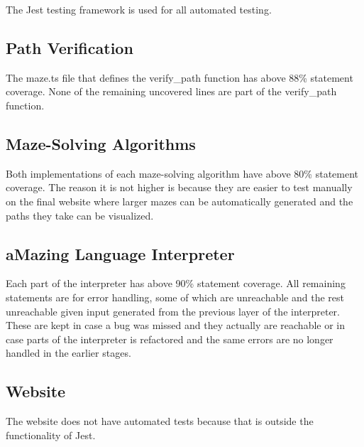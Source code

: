 The Jest \cite{jest} testing framework is used for all automated testing.

\subsection{Path Verification}

The maze.ts file that defines the verify\_path function has above 88\% statement coverage. None of the remaining uncovered lines are part of the verify\_path function.

\subsection{Maze-Solving Algorithms}

Both implementations of each maze-solving algorithm have above 80\% statement coverage. The reason it is not higher is because they are easier to test manually on the final website where larger mazes can be automatically generated and the paths they take can be visualized.

\subsection{aMazing Language Interpreter}

Each part of the interpreter has above 90\% statement coverage. All remaining statements are for error handling, some of which are unreachable and the rest unreachable given input generated from the previous layer of the interpreter. These are kept in case a bug was missed and they actually are reachable or in case parts of the interpreter is refactored and the same errors are no longer handled in the earlier stages.

\subsection{Website}

The website does not have automated tests because that is outside the functionality of Jest.
